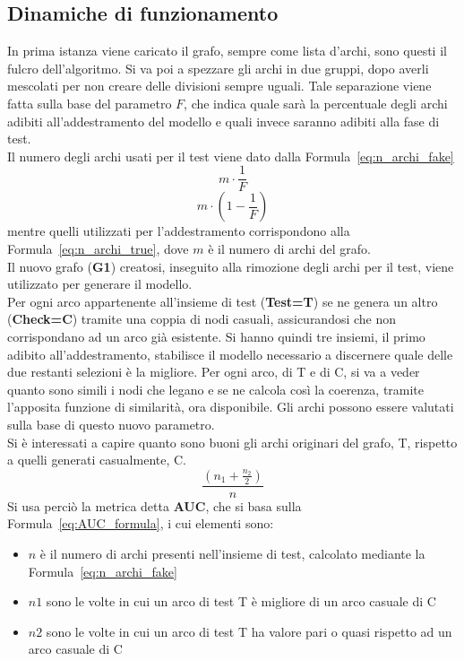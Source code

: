 \subsection{Dinamiche di funzionamento}
In prima istanza viene caricato il grafo, sempre come lista d'archi, sono questi il fulcro dell'algoritmo. Si va poi a spezzare gli archi in due gruppi, dopo averli mescolati per non creare delle divisioni sempre uguali. Tale separazione viene fatta sulla base del parametro $F$, che indica quale sarà la percentuale degli archi adibiti all'addestramento del modello e quali invece saranno adibiti alla fase di test.\\
Il numero degli archi usati per il test viene dato dalla Formula~\ref{eq:n_archi_fake}
\begin{equation}
	m \cdot \frac{1}{F}
	\label{eq:n_archi_fake}
\end{equation} 
\begin{equation}
	m \cdot \left( 1- \frac{1}{F} \right)
	\label{eq:n_archi_true}
\end{equation}
mentre quelli utilizzati per l'addestramento corrispondono alla Formula~\ref{eq:n_archi_true}, dove $m$ è il numero di archi del grafo.\\
Il nuovo grafo (\textbf{G1}) creatosi, inseguito alla rimozione degli archi per il test, viene utilizzato per generare il modello.\\
Per ogni arco appartenente all'insieme di test (\textbf{Test=T}) se ne genera un altro (\textbf{Check=C}) tramite una coppia di nodi casuali, assicurandosi che non corrispondano ad un arco già esistente. Si hanno quindi tre insiemi, il primo adibito all'addestramento, stabilisce il modello necessario a discernere quale delle due restanti selezioni è la migliore.
Per ogni arco, di T e di C, si va a veder quanto sono simili i nodi che legano e se ne calcola così la coerenza, tramite l'apposita funzione di similarità, ora disponibile. Gli archi possono essere valutati sulla base di questo nuovo parametro.\\
Si è interessati a capire quanto sono buoni gli archi originari del grafo, T, rispetto a quelli generati casualmente, C. 
\begin{equation}
	\frac{\left( n_1 + \frac{n_2}{2} \right)}{n}
	\label{eq:AUC_formula}
\end{equation}
Si usa perciò la metrica detta \textbf{AUC}\cite{AUC_metric}, che si basa sulla Formula~\ref{eq:AUC_formula}, i cui elementi sono:
\begin{itemize}
	\item $n$ è il numero di archi presenti nell'insieme di test, calcolato mediante la Formula~\ref{eq:n_archi_fake}
	\item $n1$ sono le volte in cui un arco di test T è migliore di un arco casuale di C
	\item $n2$ sono le volte in cui un arco di test T ha valore pari o quasi rispetto ad un arco casuale di C
\end{itemize}
